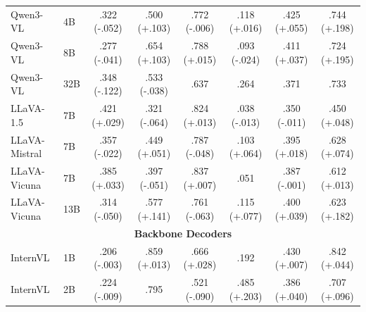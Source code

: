 \begin{table}[h]
{\begin{tabular}{ll@{\hspace{2pt}}cc@{\hspace{6pt}}cc@{\hspace{6pt}}cc}
Qwen3-VL & 4B & .322 {(\textcolor[HTML]{0072B2}{-.052})} & .500 {(\textcolor[HTML]{CC7A00}{+.103})} & .772 {(\textcolor[HTML]{0072B2}{-.006})} & .118 {(\textcolor[HTML]{CC7A00}{+.016})} & .425 {(\textcolor[HTML]{CC7A00}{+.055})} & .744 {(\textcolor[HTML]{CC7A00}{+.198})} \\
Qwen3-VL & 8B & .277 {(\textcolor[HTML]{0072B2}{-.041})} & .654 {(\textcolor[HTML]{CC7A00}{+.103})} & .788 {(\textcolor[HTML]{CC7A00}{+.015})} & .093 {(\textcolor[HTML]{0072B2}{-.024})} & .411 {(\textcolor[HTML]{CC7A00}{+.037})} & .724 {(\textcolor[HTML]{CC7A00}{+.195})} \\
Qwen3-VL & 32B & .348 {(\textcolor[HTML]{0072B2}{-.122})} & .533 {(\textcolor[HTML]{0072B2}{-.038})} & .637 & .264 & .371 & .733 \\
LLaVA-1.5 & 7B & .421 {(\textcolor[HTML]{CC7A00}{+.029})} & .321 {(\textcolor[HTML]{0072B2}{-.064})} & .824 {(\textcolor[HTML]{CC7A00}{+.013})} & .038 {(\textcolor[HTML]{0072B2}{-.013})} & .350 {(\textcolor[HTML]{0072B2}{-.011})} & .450 {(\textcolor[HTML]{CC7A00}{+.048})} \\
LLaVA-Mistral & 7B & .357 {(\textcolor[HTML]{0072B2}{-.022})} & .449 {(\textcolor[HTML]{CC7A00}{+.051})} & .787 {(\textcolor[HTML]{0072B2}{-.048})} & .103 {(\textcolor[HTML]{CC7A00}{+.064})} & .395 {(\textcolor[HTML]{CC7A00}{+.018})} & .628 {(\textcolor[HTML]{CC7A00}{+.074})} \\
LLaVA-Vicuna & 7B & .385 {(\textcolor[HTML]{CC7A00}{+.033})} & .397 {(\textcolor[HTML]{0072B2}{-.051})} & .837 {(\textcolor[HTML]{CC7A00}{+.007})} & .051 & .387 {(\textcolor[HTML]{0072B2}{-.001})} & .612 {(\textcolor[HTML]{CC7A00}{+.013})} \\
LLaVA-Vicuna & 13B & .314 {(\textcolor[HTML]{0072B2}{-.050})} & .577 {(\textcolor[HTML]{CC7A00}{+.141})} & .761 {(\textcolor[HTML]{0072B2}{-.063})} & .115 {(\textcolor[HTML]{CC7A00}{+.077})} & .400 {(\textcolor[HTML]{CC7A00}{+.039})} & .623 {(\textcolor[HTML]{CC7A00}{+.182})} \\
\midrule
\multicolumn{8}{c}{\textbf{Backbone Decoders}} \\
\midrule
InternVL & 1B & .206 {(\textcolor[HTML]{0072B2}{-.003})} & .859 {(\textcolor[HTML]{CC7A00}{+.013})} & .666 {(\textcolor[HTML]{CC7A00}{+.028})} & .192 & .430 {(\textcolor[HTML]{CC7A00}{+.007})} & .842 {(\textcolor[HTML]{CC7A00}{+.044})} \\
InternVL & 2B & .224 {(\textcolor[HTML]{0072B2}{-.009})} & .795 & .521 {(\textcolor[HTML]{0072B2}{-.090})} & .485 {(\textcolor[HTML]{CC7A00}{+.203})} & .386 {(\textcolor[HTML]{CC7A00}{+.040})} & .707 {(\textcolor[HTML]{CC7A00}{+.096})} \\

\end{tabular}}
\end{table}
